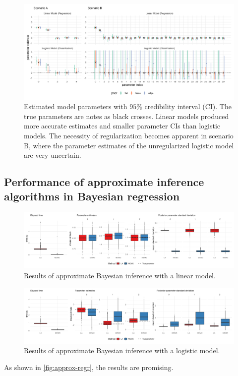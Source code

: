 \begin{figure}[htbp]
    \centering
    \includegraphics[width=\linewidth]{../figures/reg_all.png}
    \caption{Estimated model parameters with $95\%$ credibility interval (CI). The true parameters are notes as black crosses. Linear models produced more accurate estimates and smaller parameter CIs than logistic models. The necessity of regularization becomes apparent in scenario B, where the parameter estimates of the unregularized logistic model are very uncertain.}
    \label{fig:reg-params}
\end{figure}

\subsection{Performance of approximate inference algorithms in Bayesian regression}


\begin{figure}[htbp]
    \centering
    \includegraphics[width=\linewidth]{../figures/approx_regr.png}
    \caption{Results of approximate Bayesian inference with a linear model.}
    \label{fig:approx-regr}
\end{figure}

\begin{figure}[htbp]
    \centering
    \includegraphics[width=\linewidth]{../figures/approx_class.png}
    \caption{Results of approximate Bayesian inference with a logistic model.}
    \label{fig:approx-class}
\end{figure}

As shown in \autoref{fig:approx-regr}, the results are promising.
